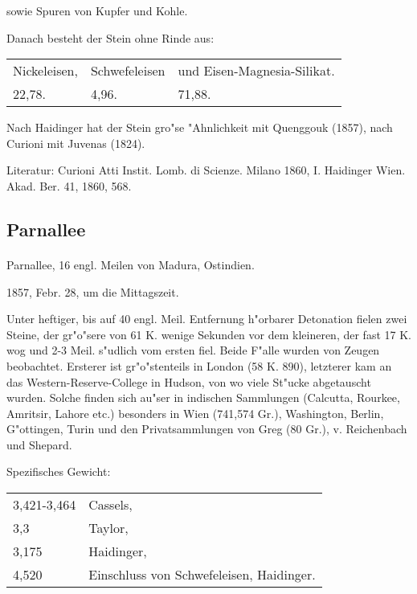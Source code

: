 \documentclass[a4paper, 11pt, oneside]{article}
\begin{document}
sowie Spuren von Kupfer und Kohle.

Danach besteht der Stein ohne Rinde aus:
\begin{table}[H]
    \centering
    \begin{tabular}{l l l}
        Nickeleisen, & Schwefeleisen & und Eisen-Magnesia-Silikat. \\
        22,78. & 4,96. & 71,88.\\
    \end{tabular}
\end{table}

Nach Haidinger hat der Stein gro"se "Ahnlichkeit mit Quenggouk (1857), nach Curioni mit Juvenas (1824).

\footnotesize
Literatur: Curioni Atti Instit. Lomb. di Scienze. Milano 1860, I. Haidinger Wien. Akad. Ber. 41, 1860, 568.

\subsection{Parnallee}
\normalsize
\paragraph{}
Parnallee, 16 engl. Meilen von Madura, Ostindien.

1857, Febr. 28, um die Mittagszeit.

Unter heftiger, bis auf 40 engl. Meil. Entfernung h"orbarer Detonation fielen zwei Steine, der gr"o"sere von 61 K. wenige Sekunden vor dem kleineren, der fast 17 K. wog und 2-3 Meil. s"udlich vom ersten fiel. Beide F"alle wurden von Zeugen beobachtet. Ersterer ist gr"o"stenteils in London (58 K. 890), letzterer kam an das Western-Reserve-College in Hudson, von wo viele St"ucke abgetauscht wurden. Solche finden sich au"ser in indischen Sammlungen (Calcutta, Rourkee, Amritsir, Lahore etc.) besonders in Wien (741,574 Gr.), Washington, Berlin, G"ottingen, Turin und den Privatsammlungen von Greg (80 Gr.), v. Reichenbach und Shepard.

Spezifisches Gewicht:  
\begin{table}[!ht]
    \centering
    \begin{tabular}{l l}
        3,421-3,464 & Cassels,\\
        3,3 & Taylor,\\
        3,175 & Haidinger,\\
        4,520 & Einschluss von Schwefeleisen, Haidinger.
    \end{tabular}
\end{table}
\end{document}
